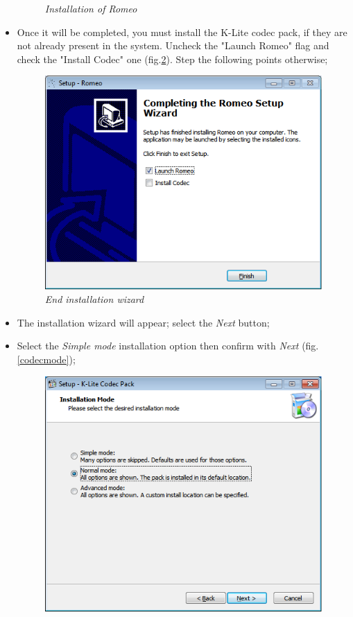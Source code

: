 \begin{itemize}
\begin{figure}[!h]
\begin{center}
\caption{\textit{Installation of Romeo}}
\label{install_romeo}
\end{center}
\end{figure}
\pagebreak
\item Once it will be completed, you must install the K-Lite codec pack, if they are not already present in the system. Uncheck the "Launch Romeo" flag and check the "Install Codec" one (fig.\ref{finish}). Step the following points otherwise;
\begin{figure}[!h]
\begin{center}
\includegraphics[scale=0.7]{./Images/finish}
\caption{\textit{End installation wizard}}
\label{finish}
\end{center}
\end{figure}
\item The installation wizard will appear; select the \textit{Next} button;
\item Select the \textit{Simple mode} installation option then confirm with \textit{Next} (fig.\ref{codecmode});
\begin{figure}[!h]
\begin{center}
\includegraphics[scale=0.7]{./Images/codec_mode}

\end{center}
\end{figure}
\end{itemize}
